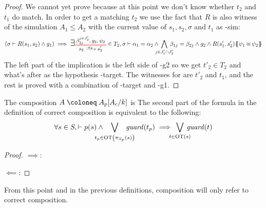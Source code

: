 \documentclass{article}
\begin{document}
\begin{proof}
	We cannot yet prove  because at this point we don't know whether \(t_2\) and \(t_1\) do match.
	In order to get a matching \(t_2\) we use the fact that \(R\) is also witness of the simulation \(A_1 \leq A_2\) with the current value of \(s_1, s_2, \sigma\) and \(t_1\) as \hyp{sim}:
	\[ \mpar{\sigma \vdash R\mpar{s_1, s_2} \wedge g_1} \implies \bigsymb{\exists} \OTx{2}{}{2}{2} \in T_2, \sigma \vdash \alpha_1 = \alpha_2 \wedge \bigwedge_\subbox{j \in J'_1 \cap J'_2} \beta_{1j} = \beta_{2j} \wedge g_2 \wedge R\mpar{s'_1, s'_2}\psubst{\psi_1 \uplus \psi_2} \]
	The left part of the implication is the left side of \hyp{g2} so we get \(t'_2 \in T_2\) and what's after as the hypothesis \hyp{target}.
	The witnesses for  are \(t'_2\) and \(t_1\), and the rest is proved with a combination of \hyp{target} and \hyp{g1}.
\end{proof}

\begin{defi}
The composition \(A \defobject A_p\subst{A_c}{k}\) is 
The second part of the formula in the definition of correct composition is equivalent to the following:
\[ \forall s \in S, \vdash p\mpar{s} \wedge \bigvee_\subbox{t_p \in \fOT{\pi_{S_p}\mpar{s}}} \fguard{t_p} \implies \bigvee_\subbox{t \in \fOT{s}} \fguard{t} \]
\end{defi}
\begin{proof} %
\item[\(\implies\):] %
\item[\(\impliedby\):] %
\end{proof}
From this point and in the previous definitions, composition will only refer to correct composition.

\end{document}
